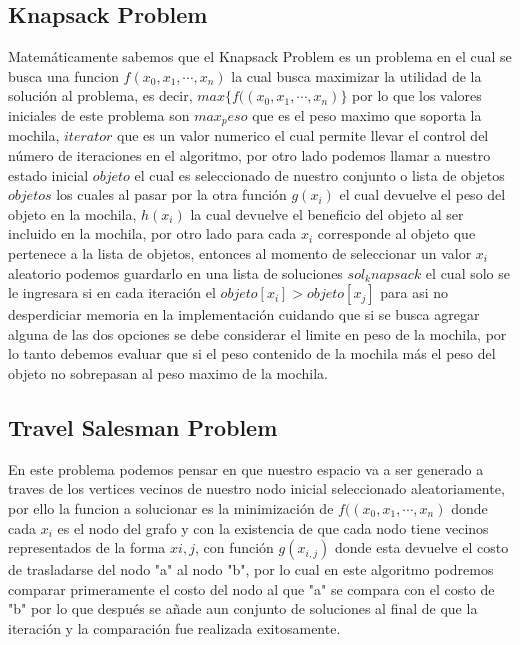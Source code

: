 \documentclass[10pt]{article}
\begin{document}
\subsection{Knapsack Problem}
Matemáticamente sabemos que el Knapsack Problem es un problema en el cual se busca una funcion $f(x_{0},x_{1},\cdots,x_{n})$ la cual busca maximizar la utilidad de la solución al problema, es decir, $max\{f((x_{0},x_{1},\cdots,x_{n})\}$ por lo que los valores iniciales de este problema son $max_peso$ que es el peso maximo que soporta la mochila, $iterator$ que es un valor numerico el cual permite llevar el control del número de iteraciones en el algoritmo, por otro lado podemos llamar a nuestro estado inicial $objeto$ el cual es seleccionado de nuestro conjunto o lista de objetos $objetos$ los cuales al pasar por la otra función $g(x_{i})$ el cual devuelve el peso del objeto en la mochila, $h(x_{i})$ la cual devuelve el beneficio del objeto al ser incluido en la mochila, por otro lado para cada $x_{i}$ corresponde al objeto que pertenece a la lista de objetos, entonces al momento de seleccionar un valor $x_{i}$ aleatorio podemos guardarlo en una lista de soluciones $sol_knapsack$ el cual solo se le ingresara si en cada iteración el $objeto [x_{i}] > objeto [x_{j}] $ para asi no desperdiciar memoria en la implementación cuidando que si se busca agregar alguna de las dos opciones se debe considerar el limite en peso de la mochila, por lo tanto debemos evaluar que si el peso contenido de la mochila más el peso del objeto no sobrepasan al peso maximo de la mochila.
\subsection{Travel Salesman Problem}
En este problema podemos pensar en que nuestro espacio va a ser generado a traves de los vertices vecinos de nuestro nodo inicial seleccionado aleatoriamente, por ello la funcion a solucionar es la minimización de $f((x_{0},x_{1},\cdots,x_{n})$ donde cada $x_{i}$ es el nodo del grafo y con la existencia de que cada nodo tiene vecinos representados de la forma $x{i,j}$, con función $g(x_{i,j})$ donde esta devuelve el costo de trasladarse del nodo "a" al nodo "b", por lo cual en este algoritmo podremos comparar primeramente el costo del nodo al que "a" se compara con el costo de "b" por lo que después se añade aun conjunto de soluciones al final de que la iteración y la comparación fue realizada exitosamente.
\end{document}
